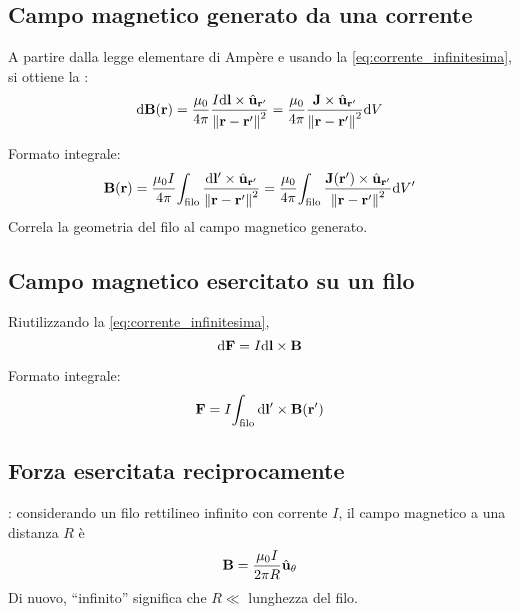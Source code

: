 \subsection{Campo magnetico generato da una corrente}

A partire dalla legge elementare di Ampère e usando la \eqref{eq:corrente_infinitesima}, si ottiene la :
\begin{equation}
\label{eq:ampere_laplace}
    \mathrm{d}\mathbf{B}(\mathbf{r}) = \frac{\mu_0}{4\pi} \frac{I \mathrm{d} \mathbf{l} \times \hat{\mathbf{u}}_{\mathbf{r}'}}{\left\lVert \mathbf{r} -\mathbf{r}' \right\rVert^2}
    = \frac{\mu_0}{4\pi} \frac{\mathbf{J} \times \hat{\mathbf{u}}_{\mathbf{r}'}}{\left\lVert \mathbf{r} -\mathbf{r}' \right\rVert^2} \mathrm{d} V
\end{equation}

Formato integrale:
\begin{equation}
\label{eq:ampere_laplace_integrale}
    \mathbf{B}(\mathbf{r}) = \frac{\mu_0 I}{4\pi} \!\int_\text{filo} \frac{\mathrm{d} \mathbf{l}' \times \hat{\mathbf{u}}_{\mathbf{r}'}}{\left\lVert \mathbf{r} -\mathbf{r}' \right\rVert^2}
    = \frac{\mu_0}{4\pi} \!\int_\text{filo} \frac{\mathbf{J}(\mathbf{r}') \times \hat{\mathbf{u}}_{\mathbf{r}'}}{\left\lVert \mathbf{r} -\mathbf{r}' \right\rVert^2} \mathrm{d} V'
\end{equation}
Correla la geometria del filo al campo magnetico generato.

\subsection{Campo magnetico esercitato su un filo}

Riutilizzando la \eqref{eq:corrente_infinitesima},
\begin{equation}
    \mathrm{d}\mathbf{F} = I \mathrm{d}\mathbf{l} \times \mathbf{B}
\end{equation}

Formato integrale:
\begin{equation}
    \mathbf{F} = I\!\int_\text{filo} \mathrm{d}\mathbf{l}' \times \mathbf{B}(\mathbf{r}')
\end{equation}

\subsection{Forza esercitata reciprocamente}
\label{sec:def_ampere}

: considerando un filo rettilineo infinito con corrente $I$, il campo magnetico a una distanza $R$ è
\begin{equation}
\label{eq:biot_savart}
    \mathbf{B} = \frac{\mu_0 I}{2\pi R} \hat{\mathbf{u}}_{\theta}
\end{equation}
Di nuovo, ``infinito'' significa che $R \ll$ lunghezza del filo.

